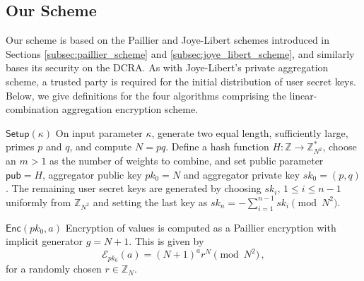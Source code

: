 \documentclass[10pt,journal,compsoc]{IEEEtran}
\theoremstyle{definition}
\theoremstyle{definition}
\theoremstyle{remark}
\begin{document}
\subsection{Our Scheme} \label{subsec:our_scheme}
Our scheme is based on the Paillier and Joye-Libert schemes introduced in Sections \ref{subsec:paillier_scheme} and \ref{subsec:joye_libert_scheme}, and similarly bases its security on the DCRA. As with Joye-Libert's private aggregation scheme, a trusted party is required for the initial distribution of user secret keys. Below, we give definitions for the four algorithms comprising the linear-combination aggregation encryption scheme.

\begin{LaTeXdescription}
    \item[$\mathsf{Setup}(\kappa)$] On input parameter $\kappa$, generate two equal length, sufficiently large, primes $p$ and $q$, and compute $N=pq$. Define a hash function $H:\mathbb{Z} \rightarrow \mathbb{Z}_{N^2}^*$, choose an $m>1$ as the number of weights to combine, and set public parameter $\mathsf{pub}=H$, aggregator public key $pk_0 = N$ and aggregator private key $sk_0=(p,q)$. The remaining user secret keys are generated by choosing $sk_i,\,1\leq i\leq n-1$ uniformly from $\mathbb{Z}_{N^2}$ and setting the last key as $sk_n = -\sum^{n-1}_{i=1}sk_i \pmod{N^2}$.
 
    \item[$\mathsf{Enc}(pk_0, a)$] Encryption of values is computed as a Paillier encryption with implicit generator $g=N+1$. This is given by
    \begin{equation}
        \mathcal{E}_{pk_0}(a) = (N+1)^{a}r^N \pmod{N^2}\,, \label{eqn:our_scheme_encrypt}
    \end{equation}
    for a randomly chosen $r \in \mathbb{Z}_N$.


\end{LaTeXdescription}
\end{document}
